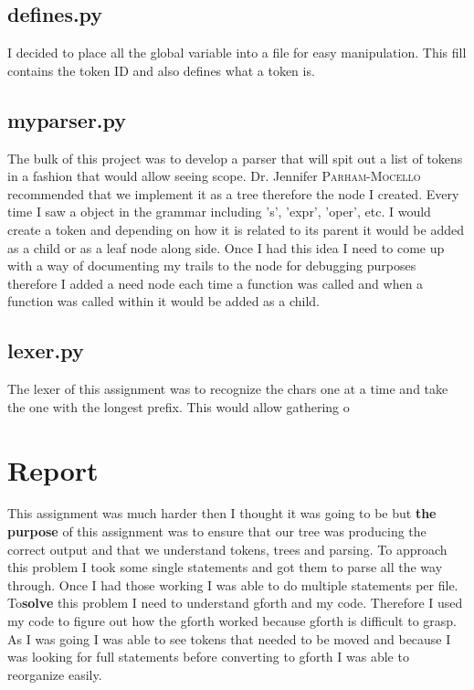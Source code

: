 \documentclass[letterpaper,10pt]{article}
\def\supervisor{Dr. Jennifer \textsc{Parham-Mocello }} %
\begin{document}
\subsection{defines.py}
\begin{mdframed}[style=MyFrame]
I decided to place all the global variable into a file for easy manipulation. This fill contains the token ID and also defines what a token is. 
\end{mdframed}
\subsection{myparser.py}
\begin{mdframed}[style=MyFrame]
The bulk of this project was to develop a parser that will spit out a list of tokens in a fashion that would allow seeing scope. \supervisor recommended that we implement it as a tree therefore the node I created. Every time I saw a object in the grammar including 's', 'expr', 'oper', etc. I would create a token and depending on how it is related to its parent it would be added as a child or as a leaf node along side. Once I had this idea I need to come up with a way of documenting my trails to the node for debugging purposes therefore I added a need node each time a function was called and when a function was called within it would be added as a child. 
\end{mdframed}
\subsection{lexer.py}
\begin{mdframed}[style=MyFrame]
The lexer of this assignment was to recognize the chars one at a time and take the one with the longest prefix. This would allow gathering o 
\end{mdframed}

\newpage
\section{Report}

\begin{mdframed}[style=MyFrame]
This assignment was much harder then I thought it was going to be but \textbf{the purpose} of this assignment was to ensure that our tree was producing the correct output and that we understand tokens, trees and parsing. To approach this problem I took some single statements and got them to parse all the way through. Once I had those working I was able to do multiple statements per file. To\textbf{solve} this problem I need to understand gforth and my code. Therefore I used my code to figure out how the gforth worked because gforth is difficult to grasp. As I was going I was able to see tokens that needed to be moved and because I was looking for full statements before converting to gforth I was able to reorganize easily.

\end{mdframed}
\end{document}
